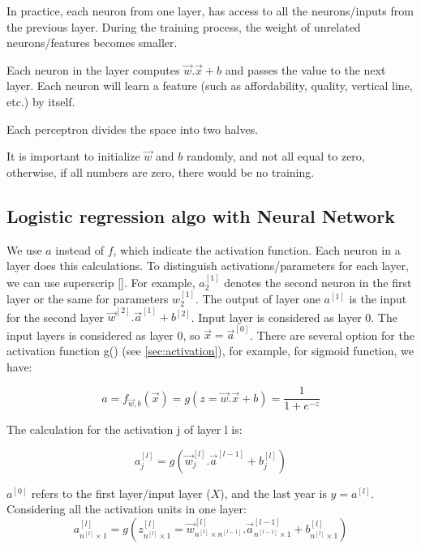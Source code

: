 \documentclass[12pt]{report}
\begin{document}
In practice, each neuron from one layer, has access to all the neurons/inputs from the previous layer. During the training process, the weight of unrelated neurons/features becomes smaller.

Each neuron in the layer computes $\overrightarrow{w} . \overrightarrow{x}+b$ and passes the value to the next layer. Each neuron will learn a feature (such as affordability, quality, vertical line, etc.) by itself.

Each perceptron divides the space into two halves.

It is important to initialize $\overrightarrow{w}$ and $ b$ randomly, and not all equal to zero, otherwise, if all numbers are zero, there would be no training.


\subsection{Logistic regression algo with Neural Network}
We use $a$ instead of $f$, which indicate the activation function. Each neuron in a layer does this calculations. To distinguish activations/parameters for each layer, we can use superscrip []. For example, $a_2^{[1]}$ denotes the second neuron in the first layer or the same for parameters $w_2^{[1]}$. The output of layer one $a^{[1]}$ is the input for the second layer $\overrightarrow{w}^{[2]} . \overrightarrow{a}^{[1]}+b^{[2]}$. Input layer is considered as layer 0. The input layers is considered as layer 0, so $\overrightarrow{x}=\overrightarrow{a}^{[0]}$. There are several option for the activation function g() (see \ref{sec:activation}), for example, for sigmoid function, we have:

\begin{equation}
  a= f_{\overrightarrow{w},b}(\overrightarrow{x}) = g(z=\overrightarrow{w} . \overrightarrow{x}+b) = \frac{1}{1+e^{-z}}
\end{equation}

The calculation for the activation j of layer l is:

\begin{equation}
  a_j^{[l]}= g(\overrightarrow{w}_j^{[l]} . \overrightarrow{a}^{[l-1]}+b_j^{[l]})
\end{equation}

$a^{[0]}$ refers to the first layer/input layer ($X$), and the last year is  $\hat{y}= a^{[l]}$. Considering all the activation units in one layer:
\begin{equation}
  a_{n^{[l]}\times1}^{[l]}= g( z_{n^{[l]}\times1}^{[l]} = \overrightarrow{w}_{n^{[l]}\times n^{[l-1]}}^{[l]} . \overrightarrow{a}_{n^{[l-1]}\times1}^{[l-1]}+b_{n^{[l]}\times1}^{[l]})
\end{equation}
\end{document}
